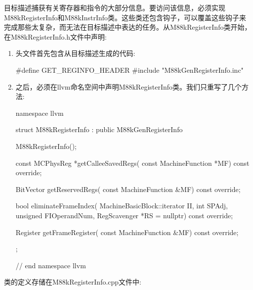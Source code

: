 
目标描述捕获有关寄存器和指令的大部分信息。要访问该信息，必须实现M88kRegisterInfo和M88kInstrInfo类。这些类还包含钩子，可以覆盖这些钩子来完成那些太复杂，而无法在目标描述中表达的任务。从M88kRegisterInfo类开始，在M88kRegisterInfo.h文件中声明:

\begin{enumerate}
\item
头文件首先包含从目标描述生成的代码:

\begin{cpp}
#define GET_REGINFO_HEADER
#include "M88kGenRegisterInfo.inc"
\end{cpp}

\item
之后，必须在llvm命名空间中声明M88kRegisterInfo类。我们只重写了几个方法:

\begin{cpp}
namespace llvm {
struct M88kRegisterInfo : public M88kGenRegisterInfo {
    M88kRegisterInfo();

    const MCPhysReg *getCalleeSavedRegs(
        const MachineFunction *MF) const override;

    BitVector getReservedRegs(
        const MachineFunction &MF) const override;

    bool eliminateFrameIndex(
        MachineBasicBlock::iterator II, int SPAdj,
        unsigned FIOperandNum,
        RegScavenger *RS = nullptr) const override;

    Register getFrameRegister(
        const MachineFunction &MF) const override;
};
} // end namespace llvm
\end{cpp}

\end{enumerate}

类的定义存储在M88kRegisterInfo.cpp文件中:

